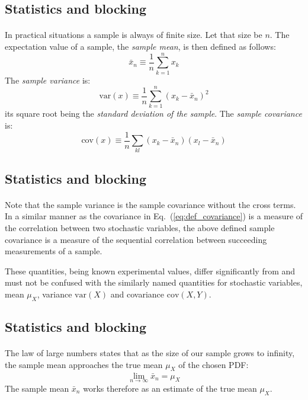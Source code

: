 \documentclass[%
twoside,                 %
final,                   %
10pt]{article}
\begin{document}
\subsection{Statistics and blocking}

\paragraph{}
In practical situations a sample is always of finite size. Let that
size be $n$. The expectation value of a sample, the \emph{sample mean}, is then defined as follows:
\[
\bar{x}_n \equiv \frac{1}{n}\sum_{k=1}^n x_k
\]
The \emph{sample variance} is:
\[
\mathrm{var}(x) \equiv \frac{1}{n}\sum_{k=1}^n (x_k - \bar{x}_n)^2
\]
its square root being the \emph{standard deviation of the sample}. The
\emph{sample covariance} is:
\[
\mathrm{cov}(x)\equiv\frac{1}{n}\sum_{kl}(x_k - \bar{x}_n)(x_l - \bar{x}_n)
\]



\subsection{Statistics and blocking}

\paragraph{}
Note that the sample variance is the sample covariance without the
cross terms. In a similar manner as the covariance in Eq.~(\ref{eq:def_covariance}) is a measure of the correlation between
two stochastic variables, the above defined sample covariance is a
measure of the sequential correlation between succeeding measurements
of a sample.

These quantities, being known experimental values, differ
significantly from and must not be confused with the similarly named
quantities for stochastic variables, mean $\mu_X$, variance $\mathrm{var}(X)$
and covariance $\mathrm{cov}(X,Y)$.



\subsection{Statistics and blocking}

\paragraph{}
The law of large numbers
states that as the size of our sample grows to infinity, the sample
mean approaches the true mean $\mu_X^{\phantom X}$ of the chosen PDF:
\[
\lim_{n\to\infty}\bar{x}_n = \mu_X^{\phantom X}
\]
The sample mean $\bar{x}_n$ works therefore as an estimate of the true
mean $\mu_X^{\phantom X}$.
\end{document}
